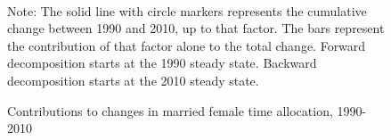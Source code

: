 \documentclass[12pt]{article}
\newcommand{\note}[1]{\caption*{Note: {#1}} }
\begin{document}
\begin{figure}[hp]
	\centering
	\caption{Contributions to changes in married female time allocation, 1990-2010}\label{fig:decomp_ta_f}
	\\
	\note{The solid line with circle markers represents the cumulative change between 1990 and 2010, up to that factor. The bars represent the contribution of that factor alone to the total change. Forward decomposition starts at the 1990 steady state. Backward decomposition starts at the 2010 steady state.}
\end{figure}
\end{document}

